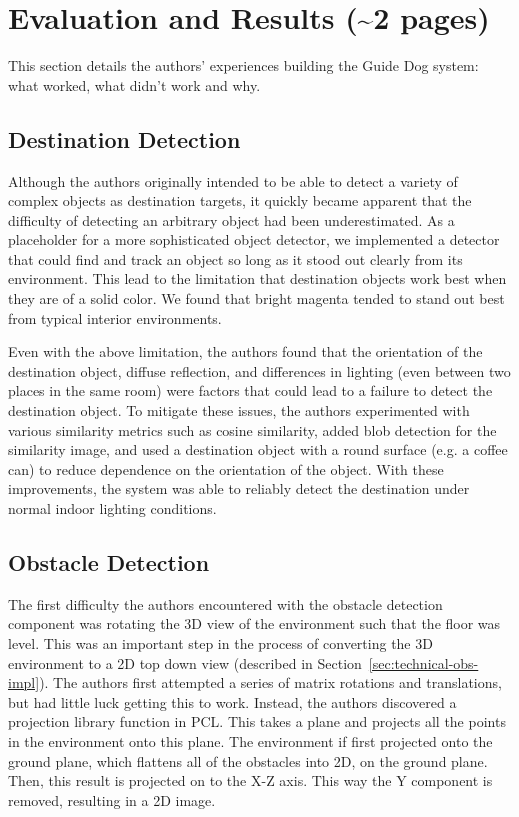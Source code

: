\section{Evaluation and Results (\textasciitilde 2 pages)}
\label{sec:eval}

This section details the authors' experiences building the Guide Dog system:
what worked, what didn't work and why.

\subsection{Destination Detection}
\label{sec:eval-dest}

Although the authors originally intended to be able to detect a variety
of complex objects as destination targets, it quickly became apparent that
the difficulty of detecting an arbitrary object had been underestimated.
As a placeholder for a more sophisticated object detector, we implemented
a detector that could find and track an object so long as it stood out
clearly from its environment. This lead to the limitation that
destination objects work best when they are of a solid color. We found
that bright magenta tended to stand out best from typical interior
environments. 

Even with the above limitation, the authors found that the orientation
of the destination object, diffuse reflection, and differences in lighting
(even between two places in the same room) were factors that could lead
to a failure to detect the destination object. To mitigate these issues,
the authors experimented with various similarity metrics such as cosine
similarity, added blob detection for the similarity image, and used a
destination object with a round surface (e.g. a coffee can) to reduce
dependence on the orientation of the object. With these improvements,
the system was able to reliably detect the destination under normal
indoor lighting conditions. 



\subsection{Obstacle Detection}
\label{sec:eval-obs}

The first difficulty the authors encountered with the obstacle detection
component was rotating the 3D view of the environment such that the floor was
level. This was an important step in the process of converting the 3D
environment to a 2D top down view (described in
Section~\ref{sec:technical-obs-impl}). The authors first attempted a series of
matrix rotations and translations, but had little luck getting this to work.
Instead, the authors discovered a projection library function in PCL. This takes
a plane and projects all the points in the environment onto this plane. The
environment if first projected onto the ground plane, which flattens all of the
obstacles into 2D, on the ground plane. Then, this result is projected on to the
X-Z axis. This way the Y component is removed, resulting in a 2D image.

